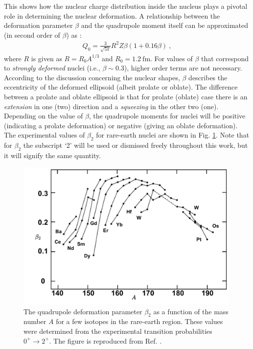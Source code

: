 This shows how the nuclear charge distribution inside the nucleus plays a pivotal role in determining the nuclear deformation. A relationship between the deformation parameter $\beta$ and the quadrupole moment itself can be approximated (in second order of $\beta$) as \cite{krane1991introductory}:
\begin{align}
    Q_0=\frac{3}{\sqrt{5\pi}}R^2Z\beta(1+0.16\beta)\ ,
    \label{quadrupole-moment-Q0}
\end{align}
where $R$ is given as $R=R_0A^{1/3}$ and $R_0=1.2\ \text{fm}$. For values of $\beta$ that correspond to \emph{strongly deformed} nuclei (i.e., $\beta\sim 0.3$), higher order terms are not necessary. According to the discussion concerning the nuclear shapes, $\beta$ describes the eccentricity of the deformed ellipsoid (albeit prolate or oblate). The difference between a prolate and oblate ellipsoid is that for prolate (oblate) case there is an \emph{extension} in one (two) direction and a \emph{squeezing} in the other two (one). Depending on the value of $\beta$, the quadrupole moments for nuclei will be positive (indicating a prolate deformation) or negative (giving an oblate deformation). The experimental values of $\beta_2$ for rare-earth nuclei are shown in Fig. \ref{fig-quadrupole-beta-nuclides}. Note that for $\beta_2$ the subscript `2' will be used or dismissed freely throughout this work, but it will signify the same quantity. 
\begin{figure}
    \centering
    \includegraphics[width=0.99\textwidth]{Chapters/Figures/quadrupole_Deformation_rareEarth.pdf}
    \caption{The quadrupole deformation parameter $\beta_2$ as a function of the mass number $A$ for a few isotopes in the rare-earth region. These values were determined from the experimental transition probabilities $0^+\to 2^+$. The figure is reproduced from Ref. \cite{casten2000nuclear}.}
    \label{fig-quadrupole-beta-nuclides}
\end{figure}

